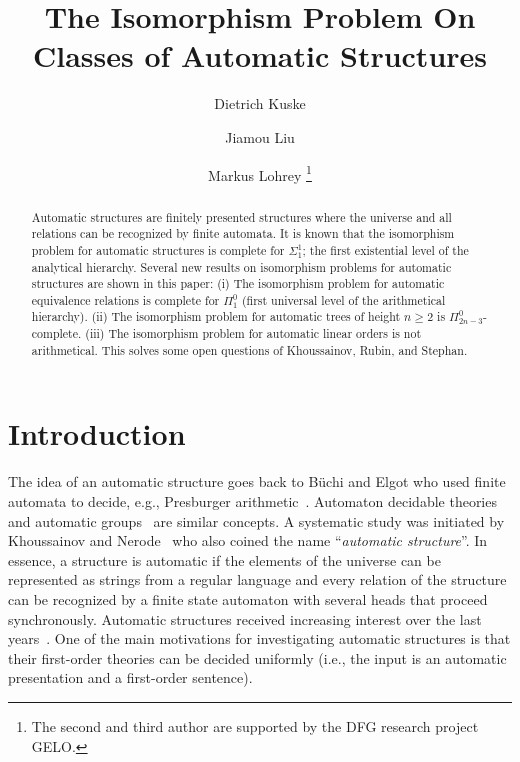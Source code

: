 \documentclass[envcountsame]{llncs}
\begin{document}
\title{The Isomorphism Problem On Classes of Automatic Structures}
\author{Dietrich Kuske \and Jiamou Liu \and  Markus Lohrey
\thanks{The second and third author are supported by the DFG  research project GELO.}
}

\maketitle
\pagestyle{plain}

\begin{abstract}
Automatic structures are finitely presented structures
where the universe and all relations can be recognized by finite automata.
It is known that
the isomorphism problem for automatic structures is complete for $\Sigma^1_1$;
the first existential level of the analytical hierarchy.
Several new results on isomorphism problems for automatic structures are shown in this paper:
(i) The isomorphism problem for automatic equivalence relations is complete for $\Pi^0_1$
(first universal level of the arithmetical hierarchy).
(ii) The isomorphism problem for automatic trees of height $n \geq 2$ is
 $\Pi^0_{2n-3}$-complete.
(iii) The isomorphism problem for automatic linear orders is not arithmetical.
This solves some open questions of Khoussainov, Rubin, and Stephan. 
\end{abstract}


\section{Introduction}

The idea of an automatic structure goes back to B\"uchi and Elgot who
used finite automata to decide, e.g., Presburger
arithmetic~\cite{Elg61}. Automaton decidable theories~\cite{Hod82}
and automatic groups~\cite{EpsCHLPT92} are similar concepts. A
systematic study was initiated by Khoussainov and Nerode~\cite{KhoN95}
who also coined the name ``{\em automatic structure}''.
In essence, a structure is automatic if the elements of the universe can be
represented as strings from a regular language and every relation of the structure
can be recognized by a finite state automaton with several heads that
proceed synchronously.  Automatic structures received
increasing interest over the last
years~\cite{BarKR08,BluG04,IsKhRu02,KhoNRS07,KhoRS05,KusLo09JSL,Rub08}.
One of the main motivations for investigating automatic structures is that
their first-order theories can be decided uniformly (i.e., the input
is an automatic presentation and a first-order sentence).
\end{document}
